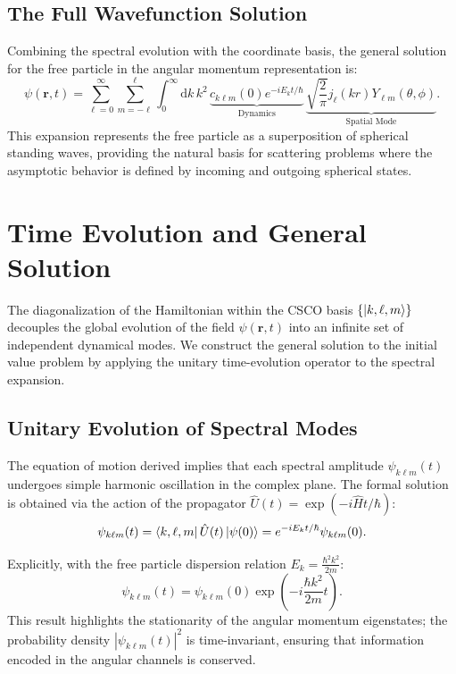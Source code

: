 \subsection{The Full Wavefunction Solution}

Combining the spectral evolution with the coordinate basis, the general solution
for the free particle in the angular momentum representation is:
\begin{equation}
	\psi(\mathbf{r}, t) = \sum_{\ell=0}^{\infty} \sum_{m=-\ell}^{\ell}
	\int_{0}^{\infty} \mathrm{d}k \, k^2 \, \underbrace{c_{k\ell m}(0) e^{-i
		E_k t/\hbar}}_{\text{Dynamics}} \, \underbrace{\sqrt{\frac{2}{\pi}}
		j_\ell(kr) Y_{\ell m}(\theta, \phi)}_{\text{Spatial Mode}}.
\end{equation}
This expansion represents the free particle as a superposition of spherical
standing waves, providing the natural basis for scattering problems where the
asymptotic behavior is defined by incoming and outgoing spherical states.

\section{Time Evolution and General Solution}

The diagonalization of the Hamiltonian within the CSCO basis $\{ \ket{k, \ell, m}
\}$ decouples the global evolution of the field $\psi(\mathbf{r}, t)$ into an
infinite set of independent dynamical modes. We construct the general solution
to the initial value problem by applying the unitary time-evolution operator to
the spectral expansion.

\subsection{Unitary Evolution of Spectral Modes}

The equation of motion derived implies
that each spectral amplitude $\psi_{k\ell m}(t)$ undergoes simple harmonic
oscillation in the complex plane. The formal solution is obtained via the action
of the propagator $\hat{U}(t) = \exp(-i\hat{H}t/\hbar)$:
\begin{equation}
	\psi_{k\ell m}(t) = \bra{k, \ell, m} \hat{U}(t) \ket{\psi(0)} = e^{-i E_k t
	/ \hbar} \psi_{k\ell m}(0).
\end{equation}

Explicitly, with the free particle dispersion relation $E_k = \frac{\hbar^2
k^2}{2m}$:
\begin{equation} \label{eq:mode_solution}
	\psi_{k\ell m}(t) = \psi_{k\ell m}(0) \exp\left( -i \frac{\hbar k^2}{2m} t
	\right).
\end{equation}
This result highlights the stationarity of the angular momentum eigenstates; the
probability density $|\psi_{k\ell m}(t)|^2$ is time-invariant, ensuring that
information encoded in the angular channels is conserved.

